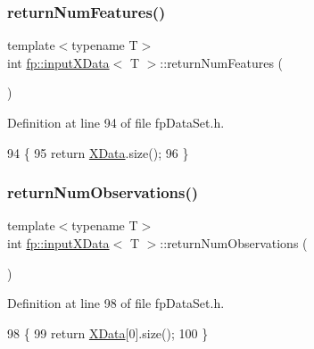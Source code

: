\subsubsection{\texorpdfstring{return\+Num\+Features()}{returnNumFeatures()}}
{\footnotesize\ttfamily template$<$typename T$>$ \\
int \hyperlink{classfp_1_1inputXData}{fp\+::input\+X\+Data}$<$ T $>$\+::return\+Num\+Features (\begin{DoxyParamCaption}{ }\end{DoxyParamCaption})\hspace{0.3cm}{\ttfamily [inline]}}



Definition at line 94 of file fp\+Data\+Set.\+h.


\begin{DoxyCode}
94                                       \{
95             \textcolor{keywordflow}{return} \hyperlink{classfp_1_1inputXData_ad08f8c44df38fb88799cda53cc50eaa5}{XData}.size();
96         \}
\end{DoxyCode}
\mbox{\label{classfp_1_1inputXData_a6608b9fdb8eddab4b391e7c3cc2b0f21}} 
\subsubsection{\texorpdfstring{return\+Num\+Observations()}{returnNumObservations()}}
{\footnotesize\ttfamily template$<$typename T$>$ \\
int \hyperlink{classfp_1_1inputXData}{fp\+::input\+X\+Data}$<$ T $>$\+::return\+Num\+Observations (\begin{DoxyParamCaption}{ }\end{DoxyParamCaption})\hspace{0.3cm}{\ttfamily [inline]}}



Definition at line 98 of file fp\+Data\+Set.\+h.


\begin{DoxyCode}
98                                           \{
99             \textcolor{keywordflow}{return} \hyperlink{classfp_1_1inputXData_ad08f8c44df38fb88799cda53cc50eaa5}{XData}[0].size();
100         \}
\end{DoxyCode}
\mbox{\label{classfp_1_1inputXData_a91f24b99ba2cc2c9b518b17783e349a8}} 
